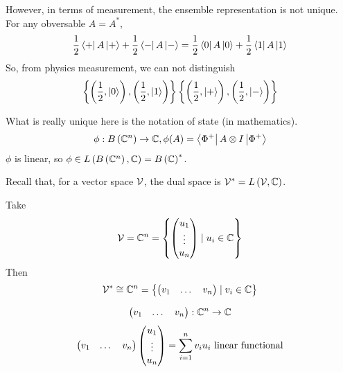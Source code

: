 However, in terms of measurement, the ensemble representation is not unique. For any
obversable $A = A^*$,
\[\frac{1}{2}\left\langle +\right|A\left|+\right\rangle + \frac{1}{2}\left\langle -\right|A\left|-\right\rangle = \frac{1}{2}\left\langle 0\right|A\left|0\right\rangle + \frac{1}{2}\left\langle 1\right|A\left|1\right\rangle\]
So, from physics measurement, we can not distinguish
\begin{align*}
    \left\lbrace\left(\frac{1}{2}, \left|0\right\rangle\right), \left(\frac{1}{2}, \left|1\right\rangle\right)\right\rbrace
    \left\lbrace\left(\frac{1}{2}, \left|+\right\rangle\right), \left(\frac{1}{2}, \left|-\right\rangle\right)\right\rbrace
\end{align*}

What is really unique here is the notation of state (in mathematics).
\[\phi:B\left(\mathbb{C}^n\right) \to \mathbb{C}, \phi(A) = \left\langle \Phi^+\right|A\otimes I\left|\Phi^+\right\rangle\]
$\phi$ is linear, so $\phi \in L\left(B\left(\mathbb{C}^n\right),\mathbb{C}\right) = B\left(\mathbb{C}\right)^*$.

Recall that, for a vector space $\mathcal{V}$, the dual space
is $\mathcal{V}^* = L\left(\mathcal{V},\mathbb{C}\right)$.

\begin{example}
    Take
    \[\mathcal{V} = \mathbb{C}^n = \left\lbrace\begin{pmatrix}u_1\\\vdots\\u_n\end{pmatrix}\mid u_i\in\mathbb{C}\right\rbrace\]
    Then
    \[\mathcal{V}^* \cong \mathbb{C}^n = \left\lbrace\begin{pmatrix}v_1&\dots&v_n\end{pmatrix}\mid v_i\in\mathbb{C}\right\rbrace\]
\end{example}

\[\begin{pmatrix}v_1&\dots&v_n\end{pmatrix} : \mathbb{C}^n \to \mathbb{C}\]
\[\begin{pmatrix}v_1&\dots&v_n\end{pmatrix}\begin{pmatrix}u_1\\\vdots\\u_n\end{pmatrix} = \sum_{i=1}^nv_iu_i\hbox{ linear functional}\]

